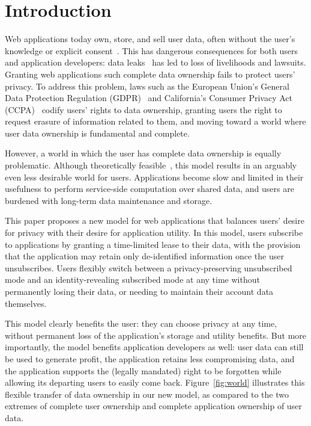 \section{Introduction}

Web applications today own, store, and sell user data, often without the user's knowledge or
explicit consent~\cite{nytimes:fb, npr:data}. This has dangerous consequences for both users and
application developers: data leaks~\cite{breach:twitter, breach:fb, breach:marriott, breach:quora}
has led to loss of livelihoods and lawsuits. Granting web applications such complete data
ownership fails to protect users' privacy. To address this problem, laws such as the European
Union's General Data Protection Regulation (GDPR)~\cite{eu:gdpr} and California's Consumer Privacy
Act (CCPA)~\cite{ca:privacy-act} codify users' rights to data ownership, granting users the right to
request erasure of information related to them, and moving toward a world where user data ownership
is fundamental and complete.

However, a world in which the user has complete data ownership is equally problematic. Although
theoretically feasible~\cite{amber, w5, blockstack, bstore}, this model results in an arguably even
less desirable world for users. Applications become slow and limited in their usefulness to perform 
service-side computation over shared data, and users are burdened with long-term data
maintenance and storage. 

This paper proposes a new model for web applications that balances users' desire for privacy with
their desire for application utility. In this model, users subscribe to applications by granting a
time-limited lease to their data, with the provision that the application may retain only
de-identified information once the user unsubscribes. Users flexibly switch between a privacy-preserving
unsubscribed mode and an identity-revealing subscribed mode at any time without permanently losing
their data, or needing to maintain their account data themselves. 

This model clearly benefits the user: they can choose privacy at any time, without permanent loss of
the application's storage and utility benefits. But more importantly, the model benefits application
developers as well: user data can still be used to generate profit, the application retains less
compromising data, and the application supports the (legally mandated) right to be forgotten while
allowing its departing users to easily come back. Figure~\ref{fig:world} illustrates this
flexible transfer of data ownership in our new model, as compared to the two extremes of complete
user ownership and complete application ownership of user data.

